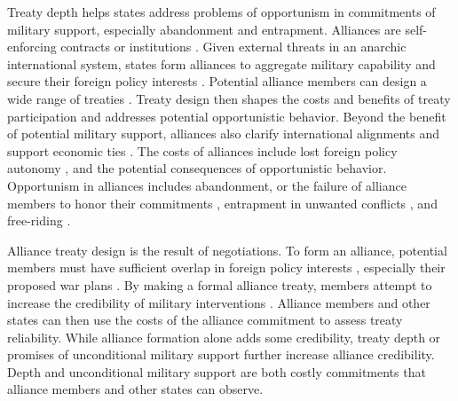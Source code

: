 \documentclass[12pt]{article}
\begin{document}
Treaty depth helps states address problems of opportunism in commitments of military support, especially abandonment and entrapment. 
Alliances are self-enforcing contracts or institutions \citep{Leedsetal2002, Morrow2000}.
Given external threats in an anarchic international system, states form alliances to aggregate military capability and secure their foreign policy interests \citep{Altfield1984, Smith1995, Snyder1997, FordhamPoast2014}. 
Potential alliance members can design a wide range of treaties \citep{Leedsetal2000, Leedsetal2002, Benson2012, BensonClinton2016}. 
Treaty design then shapes the costs and benefits of treaty participation and addresses potential opportunistic behavior. 
Beyond the benefit of potential military support, alliances also clarify international alignments \citep{Snyder1990} and support economic ties \citep{Gowa1995, Li2003, Long2003, Fordham2010, WolfordKim2017}. 
The costs of alliances include lost foreign policy autonomy \citep{Altfield1984, Morrow2000, Johnson2015}, and the potential consequences of opportunistic behavior. 
Opportunism in alliances includes abandonment, or the failure of alliance members to honor their commitments \citep{Leeds2003a, BerkemeierFuhrmann2018}, entrapment in unwanted conflicts \citep{Snyder1984}, and free-riding \citep{Morrow2000}.   


Alliance treaty design is the result of negotiations.
To form an alliance, potential members must have sufficient overlap in foreign policy interests \citep{Morrow1991, Smith1995, FordhamPoast2014}, especially their proposed war plans \citep{Poast2019a}. 
By making a formal alliance treaty, members attempt to increase the credibility of military interventions \citep{Morrow2000}. 
Alliance members and other states can then use the costs of the alliance commitment to assess treaty reliability. 
While alliance formation alone adds some credibility, treaty depth or promises of unconditional military support further increase alliance credibility. 
Depth and unconditional military support are both costly commitments that alliance members and other states can observe. 
\end{document}
